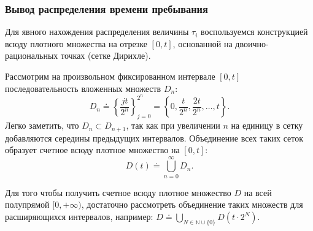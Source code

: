 \subsubsection{Вывод распределения времени пребывания}

Для явного нахождения распределения величины $\tau_i$ воспользуемся конструкцией всюду плотного множества на отрезке $[0, t]$, основанной на двоично-рациональных точках (сетке Дирихле).

Рассмотрим на произвольном фиксированном интервале $[0, t]$ последовательность вложенных множеств $D_n$:
\[
    D_n \doteq \left\{ \frac{jt}{2^n} \right\}_{j=0}^{2^n} = \left\{ 0, \frac{t}{2^n}, \frac{2t}{2^n}, \dots, t \right\}.
\]
Легко заметить, что $D_n \subset D_{n+1}$, так как при увеличении $n$ на единицу в сетку добавляются середины предыдущих интервалов. Объединение всех таких сеток образует счетное всюду плотное множество на $[0, t]$:
\[
    D(t) \doteq \bigcup_{n=0}^{\infty} D_n.
\]

\begin{center}
\end{center}

Для того чтобы получить счетное всюду плотное множество $D$ на всей полупрямой $[0, +\infty)$, достаточно рассмотреть объединение таких множеств для расширяющихся интервалов, например: $D \doteq \bigcup_{N \in \mathbb{N} \cup \{0\}} D(t \cdot 2^N)$.

